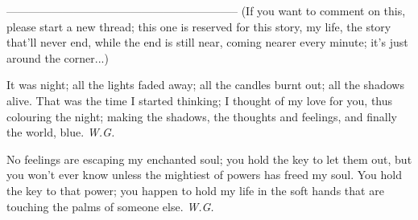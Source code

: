 --------------------------------------------------------------
(If you want to comment on this, please start a new thread; this one is reserved for this story, my life, the story that'll never end, while the end is still near, coming nearer every minute; it's just around the corner...)

It was night;
all the lights faded away;
all the candles burnt out;
all the shadows alive. 
That was the time I started thinking;
I thought of my love for you, 
thus colouring the night;
making the shadows, the thoughts and feelings,
and finally the world,
blue. 
\emph{W.G.}

No feelings are escaping my enchanted soul;
you hold the key to let them out,
but you won't ever know
unless the mightiest of powers
has freed my soul. 
You hold the key to that power;
you happen to hold my life
in the soft hands
that are touching the palms
of someone else. 
\emph{W.G.}

